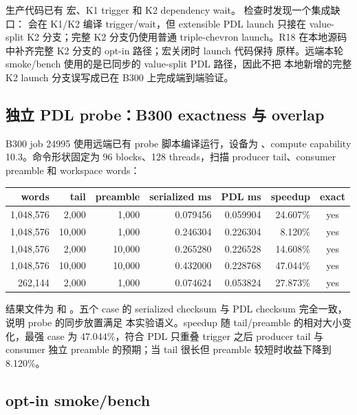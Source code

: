 生产代码已有  宏、K1 trigger 和 K2 dependency wait。
检查时发现一个集成缺口： 会在 K1/K2 编译
trigger/wait，但 extensible PDL launch 只接在 value-split K2 分支；完整
K2 分支仍使用普通 triple-chevron launch。R18 在本地源码中补齐完整 K2
分支的  opt-in 路径；宏关闭时 launch 代码保持
原样。远端本轮 smoke/bench 使用的是已同步的 value-split PDL 路径，因此不把
本地新增的完整 K2 launch 分支误写成已在 B300 上完成端到端验证。

\subsection{独立 PDL probe：B300 exactness 与 overlap}

B300 job 24995 使用远端已有 probe 脚本编译运行，设备为
、compute capability 10.3。命令形状固定为
96 blocks、128 threads，扫描 producer tail、consumer preamble 和
workspace words：

\begin{center}
\small
\begin{tabular}{@{}r r r r r r c@{}}
\toprule
words & tail & preamble & serialized ms & PDL ms & speedup & exact \\
\midrule
1,048,576 & 2,000  & 1,000  & 0.079456 & 0.059904 & 24.607\% & yes \\
1,048,576 & 10,000 & 1,000  & 0.246304 & 0.226304 &  8.120\% & yes \\
1,048,576 & 2,000  & 10,000 & 0.265280 & 0.226528 & 14.608\% & yes \\
1,048,576 & 10,000 & 10,000 & 0.432000 & 0.228768 & 47.044\% & yes \\
262,144   & 2,000  & 1,000  & 0.074624 & 0.053824 & 27.873\% & yes \\
\bottomrule
\end{tabular}
\end{center}

结果文件为
 和
。五个 case 的
serialized checksum 与 PDL checksum 完全一致，说明 probe 的同步放置满足
本实验语义。speedup 随 tail/preamble 的相对大小变化，最强 case
为 47.044\%，符合 PDL 只重叠 trigger 之后 producer tail 与 consumer
独立 preamble 的预期；当 tail 很长但 preamble 较短时收益下降到 8.120\%。

\subsection{\FlashKDA{} opt-in smoke/bench}

